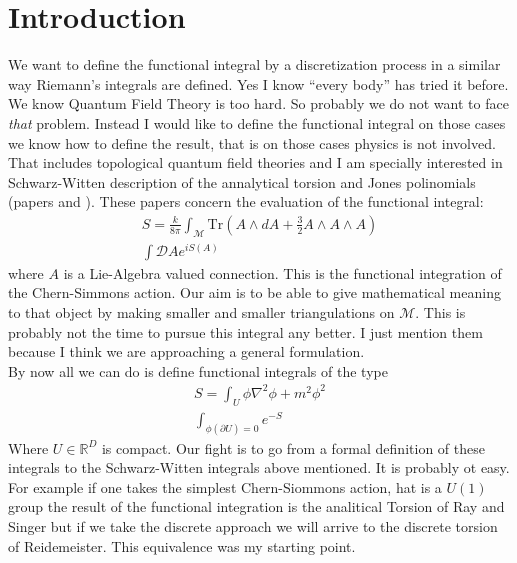\documentclass[12pt]{article}
\def\p{\partial}
\def\DD{\mathcal{D}}
\def\MM{\mathcal M}
\def\Tr{\mathrm{Tr}}
\begin{document}
\section{Introduction}
We want to define the functional integral by a discretization process in a similar way Riemann's integrals are defined. Yes I know ``every body'' has tried it before. We know Quantum Field Theory is too hard. So probably we do not want to face \textit{that} problem. Instead I would like to define the functional integral on those cases we know how to define the result, that is on those cases physics is not involved. That includes topological quantum field theories and I am specially interested in Schwarz-Witten description of the annalytical torsion and Jones polinomials (papers \cite{Sch} and \cite{Witten}). These papers concern the evaluation of the functional integral:
\begin{gather}
S=\frac{k}{8\pi}\int_\MM \Tr\left( A\wedge d A+\frac{3}{2}A\wedge A\wedge A\right)\\
\int \DD A e^{iS(A)}
\end{gather}
where $A$ is a Lie-Algebra valued connection. This is the functional integration of the Chern-Simmons action. Our aim is to be able to give mathematical meaning to that object by making smaller and smaller triangulations on $\MM$. This is probably not the time to pursue this integral any better. I just mention them because I think we are approaching a general formulation.\\
By now all we can do is define functional integrals of the type
\begin{gather}
S=\int_U \phi\nabla^2\phi+m^2\phi^2\\
\int_{\phi(\p U)=0} e^{-S}
\end{gather}
Where $U\in \mathbb R^D$ is compact. Our fight is to go from a formal definition of these integrals to the Schwarz-Witten integrals above mentioned. It is probably ot easy. For example if one takes the simplest Chern-Siommons action, hat is a $U(1)$ group the result of the functional integration is the analitical Torsion of Ray and Singer\cite{RaySing} but if we take the discrete approach we will arrive to the discrete torsion of Reidemeister. This equivalence was my starting point.
\end{document}
